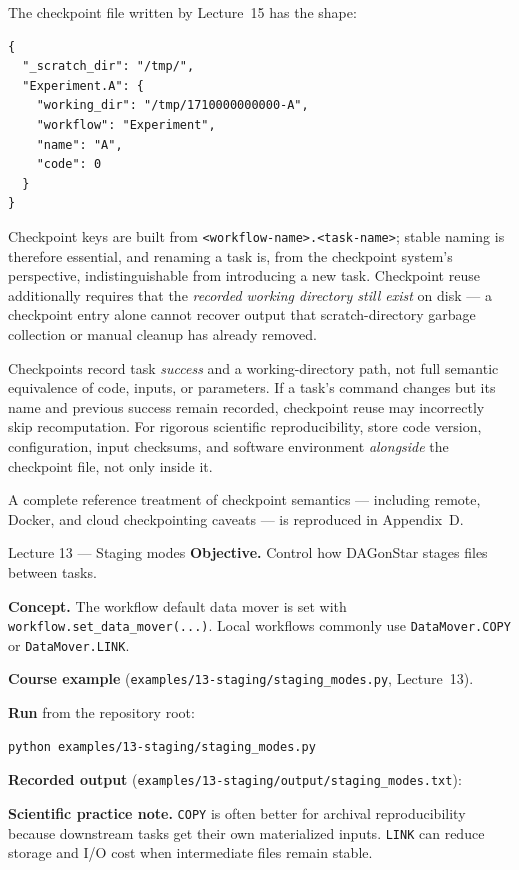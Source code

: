 The checkpoint file written by Lecture~15 has the shape:

\begin{lstlisting}[caption={Representative checkpoint JSON shape.}]
{
  "_scratch_dir": "/tmp/",
  "Experiment.A": {
    "working_dir": "/tmp/1710000000000-A",
    "workflow": "Experiment",
    "name": "A",
    "code": 0
  }
}
\end{lstlisting}

Checkpoint keys are built from \texttt{<workflow-name>.<task-name>}; stable
naming is therefore essential, and renaming a task is, from the checkpoint
system's perspective, indistinguishable from introducing a new task.
Checkpoint reuse additionally requires that the \emph{recorded working
directory still exist} on disk --- a checkpoint entry alone cannot recover
output that scratch-directory garbage collection or manual cleanup has
already removed.

\begin{cautionbox}
Checkpoints record task \emph{success} and a working-directory path, not full
semantic equivalence of code, inputs, or parameters. If a task's command
changes but its name and previous success remain recorded, checkpoint reuse
may incorrectly skip recomputation. For rigorous scientific reproducibility,
store code version, configuration, input checksums, and software environment
\emph{alongside} the checkpoint file, not only inside it.
\end{cautionbox}

A complete reference treatment of checkpoint semantics --- including remote,
Docker, and cloud checkpointing caveats --- is reproduced in Appendix~D.

\begin{lessonbox}{Lecture 13 --- Staging modes}
\textbf{Objective.} Control how DAGonStar stages files between tasks.

\textbf{Concept.} The workflow default data mover is set with
\texttt{workflow.set\_data\_mover(...)}. Local workflows commonly use
\texttt{DataMover.COPY} or \texttt{DataMover.LINK}.

\textbf{Course example} (\texttt{examples/13-staging/staging\_modes.py}, Lecture~13).


\textbf{Run} from the repository root:
\begin{lstlisting}[style=bash]
python examples/13-staging/staging_modes.py
\end{lstlisting}

\textbf{Recorded output} (\texttt{examples/13-staging/output/staging\_modes.txt}):


\textbf{Scientific practice note.} \texttt{COPY} is often better for archival
reproducibility because downstream tasks get their own materialized inputs.
\texttt{LINK} can reduce storage and I/O cost when intermediate files remain
stable.
\end{lessonbox}

